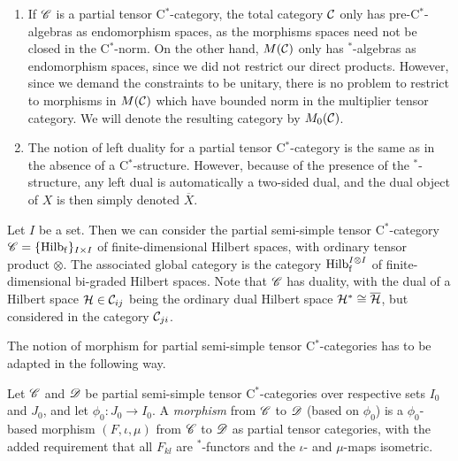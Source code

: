\begin{Rem}\begin{enumerate}\item If $\mathscr{C}$ is a partial tensor C$^*$-category, the total category $\mathcal{C}$ only has pre-C$^*$-algebras as endomorphism spaces, as the morphisms spaces need not be closed in the C$^*$-norm. On the other hand, $M(\mathcal{C})$ only has $^*$-algebras as endomorphism spaces, since we did not restrict our direct products. However, since we demand the constraints to be unitary, there is no problem to restrict to morphisms in $M(\mathcal{C})$ which have bounded norm in the multiplier tensor category. We will denote the resulting category by $M_0(\mathcal{C})$. %
\item The notion of left duality for a partial tensor C$^*$-category is the same as in the absence of a C$^*$-structure. However, because of the presence of the $^*$-structure, any left dual is automatically a two-sided dual, and the dual object of $X$ is then simply denoted $\overline{X}$.  
\end{enumerate}
\end{Rem}

\begin{Exa} Let $I$ be a set. Then we can consider the partial semi-simple tensor C$^*$-category $\mathscr{C} = \{\mathrm{Hilb}_{\operatorname{\mathrm{f}}}\}_{I\times I}$ of finite-dimensional Hilbert spaces, with ordinary tensor product $\otimes$. The associated global category is the category $\mathrm{Hilb}_{\operatorname{\mathrm{f}}}^{I\otimes I}$ of finite-dimensional bi-graded Hilbert spaces. Note that $\mathscr{C}$ has duality, with the dual of a Hilbert space $\mathcal{H} \in \mathcal{C}_{ij}$ being the ordinary dual Hilbert space $\mathcal{H}^* \cong \overline{\mathcal{H}}$, but considered in the category $\mathcal{C}_{ji}$. 
\end{Exa}

The notion of morphism for partial semi-simple tensor C$^*$-categories has to be adapted in the following way.

\begin{Def} Let $\mathscr{C}$ and $\mathscr{D}$ be partial semi-simple tensor C$^*$-categories over respective sets $I_0$ and $J_0$, and let $\phi_0:J_0\rightarrow I_0$. 
A \emph{morphism} from $\mathscr{C}$ to $\mathscr{D}$ (based on $\phi_0$) is a $\phi_0$-based morphism $(F,\iota,\mu)$ from $\mathscr{C}$ to $\mathscr{D}$ as partial tensor categories, with the added requirement that all $F_{kl}$ are $^*$-functors and the $\iota$- and $\mu$-maps isometric. 
\end{Def} 

